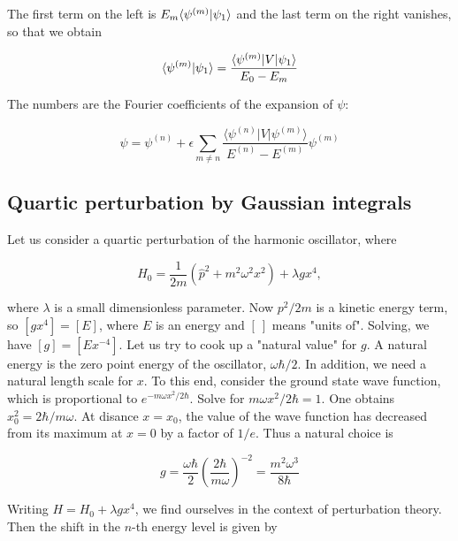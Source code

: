 The first term on the left is $E_m\langle \psi^{(m)} | \psi_1 \rangle$ and the last term on the right vanishes, so that we obtain

\begin{equation}
\label{perturbation-fourier-coefficients}
  \langle \psi^{(m)} | \psi_1 \rangle
  = \frac{\langle \psi^{(m)} | V | \psi_1 \rangle}{E_0 - E_m}
\end{equation}

The numbers are the Fourier coefficients of the expansion of $\psi$:

\begin{equation}
\label{perturbation-fourier-expansion}
  \psi = \psi^{(n)}
+ \epsilon \sum_{m \ne n} \frac{\langle \psi^{(n)} | V | \psi^{(m)} \rangle}{  E^{(n)} - E^{(m)}  }\psi^{(m)}
\end{equation}

\subsection{Quartic perturbation by Gaussian integrals}


Let us consider a quartic perturbation of the harmonic oscillator, where

\begin{equation}
H_0 = \frac{1}{2m}(\hat p^2 + m^2 \omega^2 x^2) +  \lambda g x^4,
\end{equation}

where $\lambda$ is a small dimensionless parameter.  Now $p^2/2m$ is a kinetic energy term, so $[gx^4] = [E]$, where $E$ is an energy and $[\  ]$ means "units of". Solving, we have $[g] = [Ex^{-4}]$.  Let us try to cook up a "natural value" for $g$.  A natural energy is the zero point energy of the oscillator, $\omega\hbar/2$.  In addition, we need a natural length scale for $x$.  To this end, consider the ground state wave function, which is proportional to $e^{-m\omega x^2/2\hbar}$.  Solve for $m\omega x^2/2\hbar = 1$. One obtains $x_0^2 = 2\hbar/m\omega$. At disance $x = x_0$, the value of the wave function has decreased from its maximum at $x = 0$ by a factor of $1/e$. Thus a natural choice is

\begin{equation}
g = \frac{\omega\hbar}{2}\left(\frac{2\hbar}{m\omega}\right)^{-2} = \frac{m^2 \omega^3}{8\hbar}
\end{equation}


Writing $H= H_0 + \lambda g x^4$, we find ourselves in the context of perturbation theory. Then the shift in the $n$-th energy level is given by

